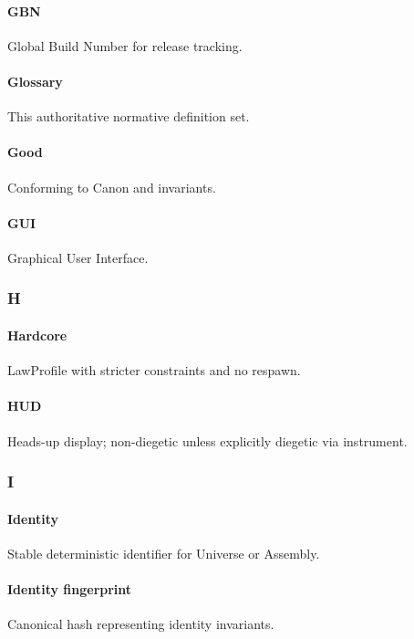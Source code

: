 \documentclass[9pt,a4paper,openany]{book}
\begin{document}
\paragraph{GBN}
Global Build Number for release tracking.\allowbreak{}


\paragraph{Glossary}
This authoritative normative definition set.\allowbreak{}


\paragraph{Good}
Conforming to Canon and invariants.\allowbreak{}


\paragraph{GUI}
Graphical User Interface.\allowbreak{}


\subsubsection{H}

\paragraph{Hardcore}
LawProfile with stricter constraints and no respawn.\allowbreak{}


\paragraph{HUD}
Heads-\allowbreak{}up display; non-\allowbreak{}diegetic unless explicitly diegetic via instrument.\allowbreak{}


\subsubsection{I}

\paragraph{Identity}
Stable deterministic identifier for Universe or Assembly.\allowbreak{}


\paragraph{Identity fingerprint}
Canonical hash representing identity invariants.\allowbreak{}
\end{document}
